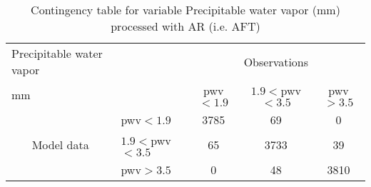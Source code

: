 
\begin{table}[]
\begin{center}
\begin{tabular}{llccc}
\hline
{Precipitable water vapor}                                       &                                                    & \multicolumn{3}{c}{Observations}                 \\
{mm}                                       &                             & pwv$<1.9$   & $1.9<$pwv$<3.5$ & pwv$>3.5$ \\
\hline
\multicolumn{1}{c}{\multirow{3}{*}{Model data}}  & pwv$<1.9$          & 3785                & 69                       & 0              \\
                                                 & $1.9<$pwv$<3.5$ & 65                & 3733                       & 39              \\
                                                 & pwv$>3.5$          & 0                & 48                       & 3810              \\
\hline
\end{tabular}
\end{center}
\caption{Contingency table for variable Precipitable water vapor (mm) processed with AR (i.e. AFT)}
\label{tab:contingency}
\end{table}
